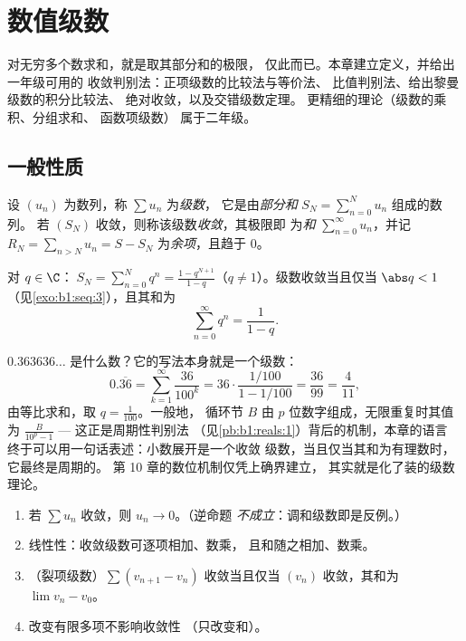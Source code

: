\chapter{数值级数}\label{ch:b1:series}

对无穷多个数求和，就是取其部分和的极限，
仅此而已。本章建立定义，并给出一年级可用的
收敛判别法：正项级数的比较法与等价法、
比值判别法、给出黎曼级数的积分比较法、
绝对收敛，以及交错级数定理。
更精细的理论（级数的乘积、分组求和、
函数项级数）
属于二年级。

\section{一般性质}

\begin{definition}\label{def:b1:series:def}
设 $(u_n)$ 为数列，称 $\sum u_n$ 为\emph{级数}，
它是由\emph{部分和} $S_N = \sum_{n=0}^{N} u_n$ 组成的数列。
若 $(S_N)$ 收敛，则称该级数\emph{收敛}，其极限即
为\emph{和} $\sum_{n=0}^{\infty} u_n$，并记 $R_N = \sum_{n > N} u_n =
S - S_N$ 为\emph{余项}，且趋于 $0$。
\end{definition}

\begin{example}[等比级数]\label{ex:b1:series:geometric}
对 $q \in \C$：$\;S_N = \sum_{n=0}^{N} q^n = \frac{1 -
q^{N+1}}{1-q}$（$q \neq 1$）。级数收敛当且仅当 $\abs q < 1$
（见\cref{exo:b1:seq:3}），且其和为
\[
\sum_{n=0}^{\infty} q^n = \frac{1}{1 - q} .
\]
\end{example}

\begin{example}[循环小数是等比级数]\label{ex:b1:series:periodicdecimal}
$0.363636\dots$ 是什么数？它的写法本身就是一个级数：
\[
0.\overline{36} = \sum_{k=1}^{\infty} \frac{36}{100^k}
= 36\cdot\frac{1/100}{1 - 1/100} = \frac{36}{99} =
\frac{4}{11} ,
\]
由等比求和，取 $q = \frac{1}{100}$。一般地，
循环节 $B$ 由 $p$ 位数字组成，无限重复时其值为
$\frac{B}{10^p - 1}$ --- 这正是周期性判别法
（见\cref{pb:b1:reals:1}）背后的机制，本章的语言
终于可以用一句话表述：小数展开是一个收敛
级数，当且仅当其和为有理数时，它最终是周期的。
第 10 章的数位机制仅凭上确界建立，
其实就是化了装的级数理论。
\end{example}

\begin{proposition}[基本性质]\label{prop:b1:series:first}
\begin{enumerate}
  \item 若 $\sum u_n$ 收敛，则 $u_n \to 0$。（逆命题
        \emph{不成立}：调和级数即是反例。）
  \item 线性性：收敛级数可逐项相加、数乘，
        且和随之相加、数乘。
  \item （裂项级数）$\sum (v_{n+1} -
        v_n)$ 收敛当且仅当 $(v_n)$ 收敛，其和为 $\lim v_n -
        v_0$。
  \item 改变有限多项不影响收敛性
        （只改变和）。
\end{enumerate}
\end{proposition}

